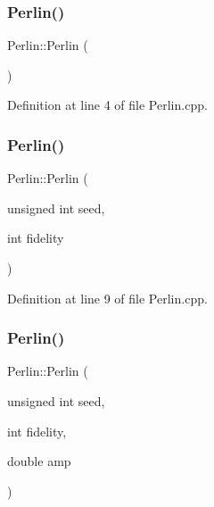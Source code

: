 \subsubsection{\texorpdfstring{Perlin()}{Perlin()}\hspace{0.1cm}{\footnotesize\ttfamily [1/3]}}
{\footnotesize\ttfamily Perlin\+::\+Perlin (\begin{DoxyParamCaption}{ }\end{DoxyParamCaption})}



Definition at line 4 of file Perlin.\+cpp.

\mbox{\label{class_world_architect_1_1_perlin_acacc541afc0af0ff3bda471f0d1988e9}} 
\subsubsection{\texorpdfstring{Perlin()}{Perlin()}\hspace{0.1cm}{\footnotesize\ttfamily [2/3]}}
{\footnotesize\ttfamily Perlin\+::\+Perlin (\begin{DoxyParamCaption}\item[{unsigned int}]{seed,  }\item[{int}]{fidelity }\end{DoxyParamCaption})}



Definition at line 9 of file Perlin.\+cpp.

\mbox{\label{class_world_architect_1_1_perlin_a683bfd35029115218bb2f775f373e7a0}} 
\subsubsection{\texorpdfstring{Perlin()}{Perlin()}\hspace{0.1cm}{\footnotesize\ttfamily [3/3]}}
{\footnotesize\ttfamily Perlin\+::\+Perlin (\begin{DoxyParamCaption}\item[{unsigned int}]{seed,  }\item[{int}]{fidelity,  }\item[{double}]{amp }\end{DoxyParamCaption})}



